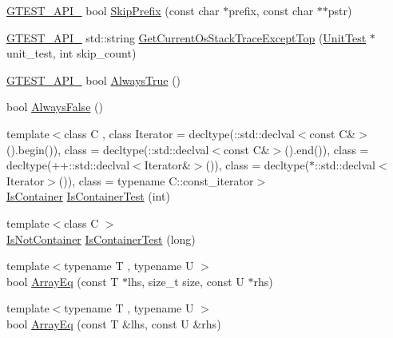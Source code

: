 \begin{DoxyCompactItemize}
\item 
\hyperlink{gtest-port_8h_aa73be6f0ba4a7456180a94904ce17790}{G\+T\+E\+S\+T\+\_\+\+A\+P\+I\+\_\+} bool \hyperlink{namespacetesting_1_1internal_aac72b20299ad4a99554ce161e1769560}{Skip\+Prefix} (const char $\ast$prefix, const char $\ast$$\ast$pstr)
\item 
\hyperlink{gtest-port_8h_aa73be6f0ba4a7456180a94904ce17790}{G\+T\+E\+S\+T\+\_\+\+A\+P\+I\+\_\+} std\+::string \hyperlink{namespacetesting_1_1internal_ae7ae495d3207e26968dfbd537c5e6dee}{Get\+Current\+Os\+Stack\+Trace\+Except\+Top} (\hyperlink{classtesting_1_1UnitTest}{Unit\+Test} $\ast$unit\+\_\+test, int skip\+\_\+count)
\item 
\hyperlink{gtest-port_8h_aa73be6f0ba4a7456180a94904ce17790}{G\+T\+E\+S\+T\+\_\+\+A\+P\+I\+\_\+} bool \hyperlink{namespacetesting_1_1internal_a4d46f09c3bfe68700b7f728d2cc3782f}{Always\+True} ()
\item 
bool \hyperlink{namespacetesting_1_1internal_a4b24c851ab13569b1b15b3d259b60d2e}{Always\+False} ()
\item 
{\footnotesize template$<$class C , class Iterator  = decltype(\+::std\+::declval$<$const C\&$>$().\+begin()), class  = decltype(\+::std\+::declval$<$const C\&$>$().\+end()), class  = decltype(++\+::std\+::declval$<$\+Iterator\&$>$()), class  = decltype($\ast$\+::std\+::declval$<$\+Iterator$>$()), class  = typename C\+::const\+\_\+iterator$>$ }\\\hyperlink{namespacetesting_1_1internal_ad8f0c2883245f1df2a53618a49f0deb3}{Is\+Container} \hyperlink{namespacetesting_1_1internal_a764748b94f628bdd1dcd39dc81e8b71f}{Is\+Container\+Test} (int)
\item 
{\footnotesize template$<$class C $>$ }\\\hyperlink{namespacetesting_1_1internal_abf080521ce135deb510e0a7830fd3d33}{Is\+Not\+Container} \hyperlink{namespacetesting_1_1internal_af545a2ae928b8a9e7581978234464275}{Is\+Container\+Test} (long)
\item 
{\footnotesize template$<$typename T , typename U $>$ }\\bool \hyperlink{namespacetesting_1_1internal_af4bebf36baf0b0a5b26d051dde55fa47}{Array\+Eq} (const T $\ast$lhs, size\+\_\+t size, const U $\ast$rhs)
\item 
{\footnotesize template$<$typename T , typename U $>$ }\\bool \hyperlink{namespacetesting_1_1internal_a49b4d0ee49c0f8c93bab29ebd20630cc}{Array\+Eq} (const T \&lhs, const U \&rhs)
\item 
$$
\end{DoxyCompactItemize}

